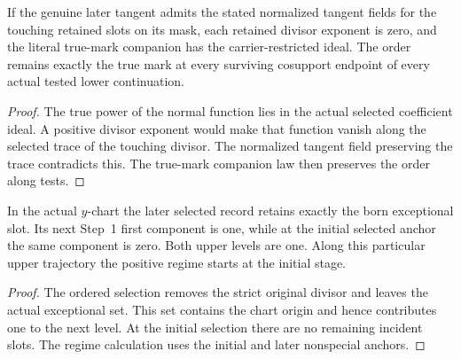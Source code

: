 \begin{theorem}
\label{hir:g1-later-selected-true-order}
\leanok
If the genuine later tangent admits the stated normalized tangent
fields for the touching retained slots on its mask, each retained
divisor exponent is zero, and the literal true-mark companion
has the carrier-restricted ideal. The order remains exactly the
true mark at every surviving cosupport endpoint of every actual
tested lower continuation.
\end{theorem}
\begin{proof}
The true power of the normal function lies in the actual selected
coefficient ideal. A positive divisor exponent would make that
function vanish along the selected trace of the touching divisor.
The normalized tangent field preserving the trace contradicts this.
The true-mark companion law then preserves the order along tests.
\end{proof}

\begin{theorem}
\label{hir:g1-joint-example-later-born-level}
\leanok
In the actual $y$-chart the later selected record retains exactly
the born exceptional slot. Its next Step~1 first component is one,
while at the initial selected anchor the same component is zero.
Both upper levels are one. Along this particular upper trajectory
the positive regime starts at the initial stage.
\end{theorem}
\begin{proof}
The ordered selection removes the strict original divisor and
leaves the actual exceptional set. This set contains the chart
origin and hence contributes one to the next level. At the initial
selection there are no remaining incident slots. The regime
calculation uses the initial and later nonspecial anchors.
\end{proof}

